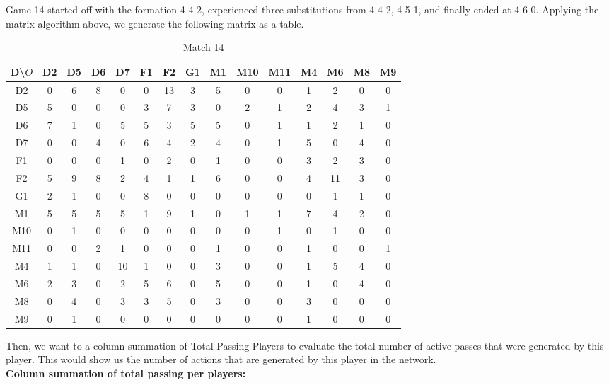 \documentclass[12pt]{article}
\begin{document}
Game 14 started off with the formation 4-4-2, experienced three substitutions from 4-4-2, 4-5-1, and finally ended at 4-6-0. Applying the matrix algorithm above, we generate the following matrix as a table.\\
\newline
\newline
\begin{table}
\begin{center}
\begin{tabular}{|c|c|c|c|c|c|c|c|c|c|c|c|c|c|c|}
\hline
D\backslash$O$ & D2 & D5 & D6 & D7 & F1 & F2 & G1 & M1 & M10 & M11 & M4 & M6 & M8 & M9\\
\hline
D2&0 & 6 & 8 & 0 & 0 & 13 & 3 & 5 & 0 & 0 & 1 & 2 & 0& 0\\
\hline
D5&5 & 0 & 0 & 0 & 3 & 7 & 3 & 0 & 2 & 1 & 2 & 4 & 3& 1 \\
\hline
D6&7 & 1 & 0 & 5& 5 & 3 & 5 & 5 & 0 & 1 & 1 & 2 & 1 & 0 \\
\hline
D7&0 & 0 & 4 & 0 & 6 & 4 & 2 & 4 & 0 & 1 & 5 & 0 & 4 & 0\\
\hline
F1&0 & 0 & 0 & 1 & 0 & 2 & 0 & 1 & 0 & 0 & 3 & 2 & 3 & 0\\
\hline
F2&5 & 9 & 8 & 2 & 4 &1 & 1 & 6 & 0 & 0 & 4 & 11 & 3 & 0\\
\hline
G1&2 & 1 & 0 & 0 & 8 & 0 & 0 & 0 & 0 & 0& 0&1 & 1 & 0 \\
\hline
M1&5&5&5&5&1&9&1&0&1&1&7&4 & 2 & 0\\
\hline
M10&0&1&0&0&0&0&0&0&0&1&0&1& 0& 0\\
\hline
M11 & 0 & 0 & 2 & 1 & 0 & 0 & 0 & 1 & 0 & 0 & 1 & 0 & 0 & 1\\
\hline
M4 &1&1&0 & 10 & 1&0&0&3& 0&0&1&5 & 4& 0\\
\hline
M6&2&3&0&2&5&6&0&5&0&0&1&0 & 4 & 0\\
\hline
M8&0&4&0&3&3&5&0&3&0&0&3&0 & 0 & 0\\
\hline
M9&0&1&0&0&0&0&0&0&0&0&1&0 & 0& 0\\
\hline
\end{tabular}
\caption{Match 14}
\end{center}
\end{table}
\newline
Then, we want to a column summation of Total Passing Players to evaluate the total number of active passes that were generated by this player. This would show us the number of actions that are generated by this player in the network. \\
\newline
\qquad \textbf{Column summation of total passing per players:}
\end{document}
